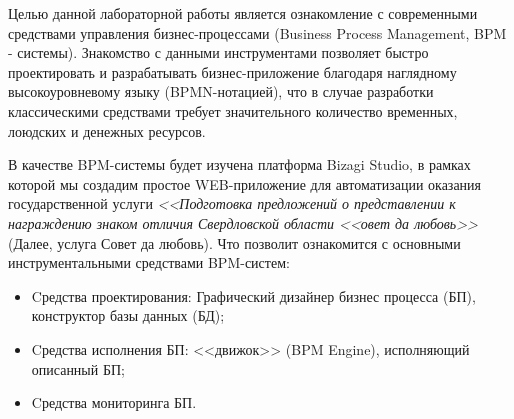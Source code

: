 \Introduction

Целью данной лабораторной работы является ознакомление с современными средствами
управления бизнес-процессами (Business Process Management, BPM - системы).
Знакомство с данными инструментами позволяет быстро проектировать и разрабатывать
бизнес-приложение благодаря наглядному высокоуровневому языку (BPMN-нотацией), что
в случае разработки классическими средствами требует значительного
количество временных, лоюдских и денежных ресурсов.

В качестве BPM-системы будет изучена платформа Bizagi Studio, в рамках которой
мы создадим простое WEB-приложение для автоматизации оказания государственной
услуги \textit{<<Подготовка предложений о представле­нии к награждению знаком
отличия Свердловской области <<овет да любовь>>}(Далее, услуга Совет да любовь).
Что позволит ознакомится с основными инструментальными средствами BPM-систем\cite{method}:

\begin{itemize}
    \item Cредства проектирования: Графический дизайнер бизнес процесса (БП),
    конструктор базы данных (БД);
    \item Cредства исполнения БП: <<движок>> (BPM Engine),
    исполняющий описанный БП;
    \item Cредства мониторинга БП.
\end{itemize}
